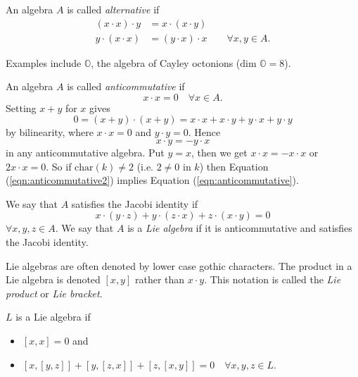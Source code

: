 \begin{definition}
  An algebra $A$ is called \emph{alternative} if
  \begin{align*}
    (x \cdot x) \cdot y &= x \cdot (x \cdot y)\\
    y \cdot (x \cdot x) &= (y \cdot x) \cdot x \qquad \forall x,y \in A.
  \end{align*}
\end{definition}
Examples include $\mathbb{O}$, the algebra of Cayley octonions ($\text{dim } \mathbb{O} = 8$).

\begin{definition}
  An algebra $A$ is called \emph{anticommutative} if
  \begin{equation}\label{eqn:anticommutative}
    x \cdot x = 0 \quad \forall x \in A.
  \end{equation}
  Setting $x+y$ for $x$ gives
  \[
    0 = (x+y) \cdot (x+y) = x \cdot x + x \cdot y + y \cdot x + y \cdot y
  \]
  by bilinearity, where $x \cdot x = 0$ and $y \cdot y = 0$. Hence
  \begin{equation}\label{eqn:anticommutative2}
    x \cdot y = -y \cdot x
  \end{equation}
  in any anticommutative algebra. Put $y=x$, then we get $x \cdot x = -x \cdot x$ or $2 x \cdot x = 0$. So if $\text{char}(k) \not= 2$ (i.e. $2 \not= 0$ in $k$) then Equation (\ref{eqn:anticommutative2}) implies Equation (\ref{eqn:anticommutative}).
\end{definition}

\begin{definition}
  We say that $A$ satisfies the Jacobi identity if
  \[
    x \cdot (y \cdot z) + y \cdot (z \cdot x) + z \cdot (x \cdot y) = 0
  \]
  $\forall x,y,z \in A$. We say that $A$ is a \emph{Lie algebra} if it is anticommutative and satisfies the Jacobi identity.
\end{definition}

\begin{remark}
  Lie algebras are often denoted by lower case gothic characters. The product in a Lie algebra is denoted $[x,y]$ rather than $x \cdot y$. This notation is called the \emph{Lie product} or \emph{Lie bracket}.

  $L$ is a Lie algebra if
  \begin{itemize}
    \item $[x,x] = 0$ and
    \item $[x,[y,z]] + [y,[z,x]] + [z,[x,y]] = 0 \quad \forall x,y,z \in L$.
  \end{itemize}
\end{remark}

